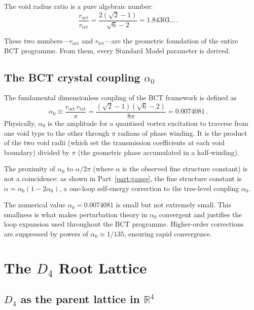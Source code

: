 \documentclass[review,number,sort&compress]{elsarticle}
\newcommand{\roct}{r_{\mathrm{oct}}}
\newcommand{\rtet}{r_{\mathrm{tet}}}
\newcommand{\azero}{\alpha_0}
\newcommand{\Dfour}{D_4}
\begin{document}
The void radius ratio is a pure algebraic number:
\begin{equation}
  \frac{\roct}{\rtet} = \frac{2(\sqrt{2}-1)}{\sqrt{6}-2}
  = 1.84303\ldots\,.
  \label{eq:void_ratio}
\end{equation}

These two numbers---$\roct$ and $\rtet$---are the geometric foundation
of the entire BCT programme. From them, every Standard Model parameter
is derived.

\subsection{The BCT crystal coupling $\azero$}
\label{sec:alpha0}

The fundamental dimensionless coupling of the BCT framework is defined as
\begin{equation}
  \azero \equiv \frac{\roct\,\rtet}{\pi}
  = \frac{(\sqrt{2}-1)(\sqrt{6}-2)}{8\pi}
  = 0.0074081\,.
  \label{eq:alpha0}
\end{equation}
Physically, $\azero$ is the amplitude for a quantised vortex excitation
to traverse from one void type to the other through $\pi$ radians of
phase winding. It is the product of the two void radii (which set the
transmission coefficients at each void boundary) divided by $\pi$
(the geometric phase accumulated in a half-winding).

The proximity of $\azero$ to $\alpha/2\pi$ (where $\alpha$ is the
observed fine structure constant) is not a coincidence: as shown in
Part~\ref{part:gauge}, the fine structure constant is $\alpha =
\azero(1 - 2\azero)$, a one-loop self-energy correction to the
tree-level coupling $\azero$.

The numerical value $\azero = 0.0074081$ is small but not extremely
small. This smallness is what makes perturbation theory in $\azero$
convergent and justifies the loop expansion used throughout the BCT
programme. Higher-order corrections are suppressed by powers of
$\azero \approx 1/135$, ensuring rapid convergence.


\section{The $\Dfour$ Root Lattice}
\label{sec:D4_lattice}

\subsection{$\Dfour$ as the parent lattice in $\mathbb{R}^4$}
\end{document}

